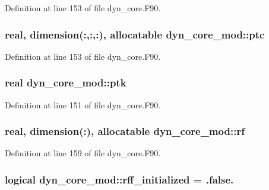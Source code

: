 Definition at line 153 of file dyn\-\_\-core.\-F90.

\subsubsection[{ptc}]{\setlength{\rightskip}{0pt plus 5cm}real, dimension(\-:,\-:,\-:), allocatable dyn\-\_\-core\-\_\-mod\-::ptc\hspace{0.3cm}{\ttfamily [private]}}\label{classdyn__core__mod_ada1ed28afc7e672fc62460bb755c7d9c}


Definition at line 153 of file dyn\-\_\-core.\-F90.

\subsubsection[{ptk}]{\setlength{\rightskip}{0pt plus 5cm}real dyn\-\_\-core\-\_\-mod\-::ptk\hspace{0.3cm}{\ttfamily [private]}}\label{classdyn__core__mod_a8743542bdd5648cf4f95698e51afc601}


Definition at line 151 of file dyn\-\_\-core.\-F90.

\subsubsection[{rf}]{\setlength{\rightskip}{0pt plus 5cm}real, dimension(\-:), allocatable dyn\-\_\-core\-\_\-mod\-::rf\hspace{0.3cm}{\ttfamily [private]}}\label{classdyn__core__mod_a53c1636fa93f014aa45af25a60d37445}


Definition at line 159 of file dyn\-\_\-core.\-F90.

\subsubsection[{rff\-\_\-initialized}]{\setlength{\rightskip}{0pt plus 5cm}logical dyn\-\_\-core\-\_\-mod\-::rff\-\_\-initialized = .false.\hspace{0.3cm}{\ttfamily [private]}}\label{classdyn__core__mod_a3ce96984cba7c0b8e6a76a9f855921c8}



